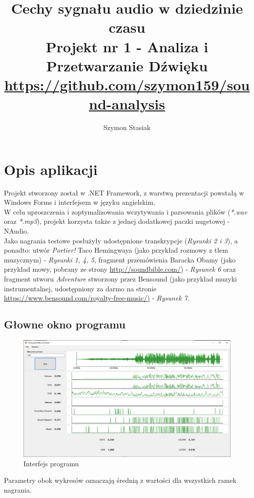 \documentclass[a4paper]{article}
\title{Cechy sygnału audio w dziedzinie czasu\\
\large Projekt nr 1 - Analiza i Przetwarzanie Dźwięku\\ 
\small \url{https://github.com/szymon159/sound-analysis}}
\date{}
\author{Szymon Stasiak}
\begin{document}
  \maketitle

\section{Opis aplikacji}
Projekt stworzony został w .NET Framework, z warstwą prezentacji powstałą w Windows Forms i interfejsem w języku angielskim.\\
W celu uproszczenia i zoptymalizowania wczytywania i parsowania plików (\textit{*.wav} oraz \textit{*.mp3}), projekt korzysta także z jednej dodatkowej paczki nugetowej - NAudio.\\
Jako nagrania testowe posłużyły udostępnione transkrypcje (\textit{Rysunki 2 i 3}), a ponadto: utwór \textit{Portier!} Taco Hemingwaya (jako przykład rozmowy z tłem muzycznym) - \textit{Rysunki 1, 4, 5}, fragment przemówienia Baracka Obamy (jako przykład mowy, pobrany ze strony \url{http://soundbible.com/}) - \textit{Rysunek 6} oraz fragment utworu \textit{Adventure} stworzony przez Bensound (jako przykład muzyki instrumentalnej, udostępniony za darmo na stronie \url{https://www.bensound.com/royalty-free-music/)} - \textit{Rysunek 7}.
\subsection{Głowne okno programu}
\begin{figure}[H]
  \includegraphics[width=\linewidth]{images/01interface.png}
  \caption{Interfejs programu}
\end{figure}
Parametry obok wykresów oznaczają średnią z wartości dla wszystkich ramek nagrania.
\end{document}

